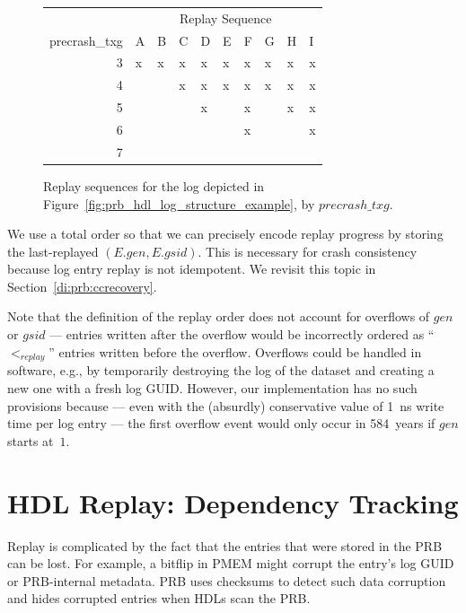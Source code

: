 \documentclass[12pt,a4paper,twoside]{book}
\begin{document}
{\begin{figure}[H]
    \centering
        \begin{tabular}{r|l|l|l|l|l|l|l|l|l|}
        \multicolumn{1}{l|}{}              & \multicolumn{9}{c|}{Replay Sequence} \\
        \multicolumn{1}{c|}{precrash\_txg} & A  & B  & C  & D & E & F & G & H & I \\ \hline
        3                                  & x  & x  & x  & x & x & x & x & x & x \\
        4                                  &    &    & x  & x & x & x & x & x & x \\
        5                                  &    &    &    & x &   & x &   & x & x \\
        6                                  &    &    &    &   &   & x &   &   & x \\
        7                                  &    &    &    &   &   &   &   &   &   \\ \cline{2-10} 
    \end{tabular}
    \caption{Replay sequences for the log depicted in Figure~\ref{fig:prb_hdl_log_structure_example}, by $precrash\_txg$. }
    \label{fig:prb_hdl_log_structure_example__replay}
\end{figure}

We use a total order so that we can precisely encode replay progress by storing the last-replayed $(E.gen, E.gsid)$.
This is necessary for crash consistency because log entry replay is not idempotent.
We revisit this topic in Section~\ref{di:prb:ccrecovery}.

Note that the definition of the replay order does not account for overflows of $gen$ or $gsid$ --- entries written after the overflow would be incorrectly ordered as ``$<_{replay}$'' entries written before the overflow.
Overflows could be handled in software, e.g., by temporarily destroying the log of the dataset and creating a new one with a fresh log GUID.
However, our implementation has no such provisions because --- even with the (absurdly) conservative value of 1~ns write time per log entry --- the first overflow event would only occur in 584~years if $gen$ starts at~$1$.

\section{HDL Replay: Dependency Tracking}\label{di:prb:deptrack}
Replay is complicated by the fact that the entries that were stored in the PRB can be lost.
For example, a bitflip in PMEM might corrupt the entry's log GUID or PRB-internal metadata.
PRB uses checksums to detect such data corruption and hides corrupted entries when HDLs scan the PRB.

}
\end{document}
